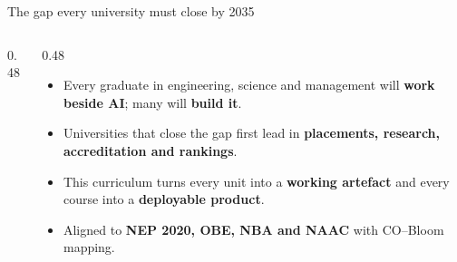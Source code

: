 \documentclass[aspectratio=169,10pt]{beamer}
\begin{document}
\begin{frame}{The gap every university must close by 2035}
\begin{columns}[T]
\begin{column}{0.48\textwidth}
\end{column}
\begin{column}{0.48\textwidth}
\small
\begin{itemize}\setlength\itemsep{6pt}
\item Every graduate in engineering, science and management will \textbf{work beside AI}; many will \textbf{build it}.
\item Universities that close the gap first lead in \textbf{placements, research, accreditation and rankings}.
\item This curriculum turns every unit into a \textbf{working artefact} and every course into a \textbf{deployable product}.
\item Aligned to \textbf{NEP 2020, OBE, NBA and NAAC} with CO--Bloom mapping.
\end{itemize}
\end{column}
\end{columns}
\end{frame}
\end{document}
